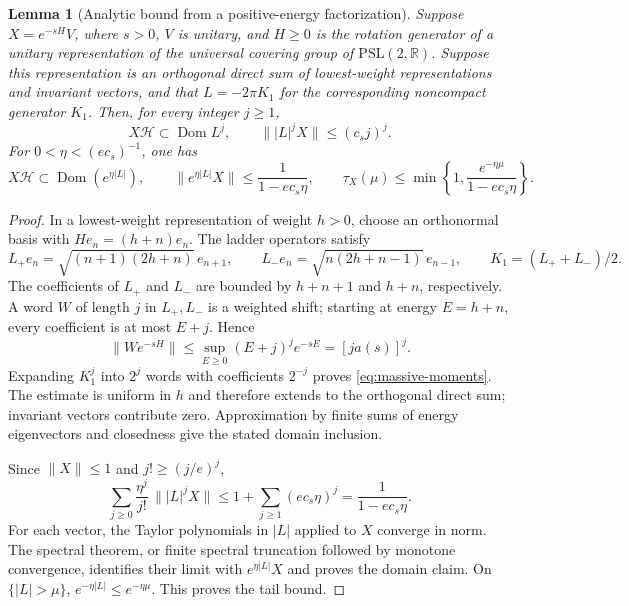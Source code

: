 \documentclass[a4paper,11pt]{article}
\newtheorem{lemma}[theorem]{Lemma}
\theoremstyle{definition}
\begin{document}
\begin{lemma}[Analytic bound from a positive-energy factorization]
\label{lem:massive-analytic-bound}
Suppose $X=e^{-sH}V$, where $s>0$, $V$ is unitary, and $H\ge0$ is the rotation
generator of a unitary representation of the universal covering group of
$\mathrm{PSL}(2,\mathbb R)$. Suppose this representation is an orthogonal direct
sum of lowest-weight representations and invariant vectors, and that
$L=-2\pi K_1$ for the corresponding noncompact generator $K_1$.
Then, for every integer $j\ge1$,
\begin{equation}
 X\mathcal H\subset\operatorname{Dom}L^j,\qquad
 \||L|^jX\|\le(c_sj)^j.
 \label{eq:massive-moments}
\end{equation}
For $0<\eta<(e c_s)^{-1}$, one has
\begin{equation}
 X\mathcal H\subset\operatorname{Dom}(e^{\eta|L|}),\qquad
 \|e^{\eta|L|}X\|\le\frac1{1-e c_s\eta},\qquad
 \tau_X(\mu)\le
 \min\left\{1,\frac{e^{-\eta\mu}}{1-e c_s\eta}\right\}.
 \label{eq:massive-exponential-bound}
\end{equation}
\end{lemma}
\begin{proof}
In a lowest-weight representation of weight $h>0$, choose an orthonormal basis
with $He_n=(h+n)e_n$. The ladder operators satisfy
\[
 L_+e_n=\sqrt{(n+1)(2h+n)}\,e_{n+1},\qquad
 L_-e_n=\sqrt{n(2h+n-1)}\,e_{n-1},\qquad
 K_1=(L_++L_-)/2.
\]
The coefficients of $L_+$ and $L_-$ are bounded by $h+n+1$ and $h+n$,
respectively. A word $W$ of length $j$ in $L_+,L_-$ is a weighted shift;
starting at energy $E=h+n$, every coefficient is at most $E+j$. Hence
\[
 \|We^{-sH}\|\le\sup_{E\ge0}(E+j)^j e^{-sE}
 =[j a(s)]^j.
\]
Expanding $K_1^j$ into $2^j$ words with coefficients $2^{-j}$ proves
\eqref{eq:massive-moments}. The estimate is uniform in $h$ and therefore
extends to the orthogonal direct sum; invariant vectors contribute zero.
Approximation by finite sums of energy eigenvectors and closedness give the
stated domain inclusion.

Since $\|X\|\le1$ and $j!\ge(j/e)^j$,
\[
 \sum_{j\ge0}\frac{\eta^j}{j!}\,\||L|^jX\|
 \le1+\sum_{j\ge1}(e c_s\eta)^j
 =\frac1{1-e c_s\eta}.
\]
For each vector, the Taylor polynomials in $|L|$ applied to $X$ converge in
norm. The spectral theorem, or finite spectral truncation followed by monotone
convergence, identifies their limit with $e^{\eta|L|}X$ and proves the domain
claim. On $\{|L|>\mu\}$, $e^{-\eta|L|}\le e^{-\eta\mu}$.
This proves the tail bound.
\end{proof}
\end{document}

